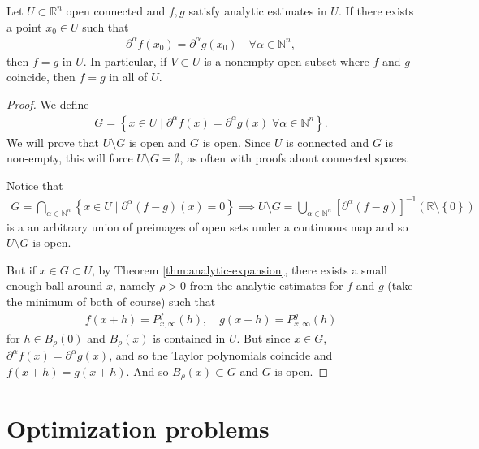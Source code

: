 \begin{corollary}
	Let $U \subset \mathbb{R}^{n}$ open connected and $f,g$ satisfy analytic estimates in $U$. If there exists a point $x_{0} \in U$ such that
	\begin{align*}
		\partial^{\alpha } f(x_{0}) = \partial^{\alpha } g(x_{0}) \quad \forall \alpha \in \mathbb{N}^{n},
	\end{align*}
	then $f = g$ in $U$. In particular, if $V \subset U$ is a nonempty open subset where $f$ and $g$ coincide, then $f = g$ in all of $U$.
\end{corollary}
\begin{proof}
	We define
	\begin{align*}
		G = \left\{ x \in U \mid \partial^{\alpha} f(x) = \partial^{\alpha }g(x) \; \forall \alpha \in \mathbb{N}^{n} \right\}.
	\end{align*}
	We will prove that $U \setminus G$ is open and $G$ is open. Since $U$ is connected and $G$ is non-empty, this will force $U \setminus G = \emptyset$, as often with proofs about connected spaces.

	Notice that
	\begin{align*}
		G = \bigcap_{\alpha \in \mathbb{N}^{n}} \left\{ x \in U \mid \partial^{\alpha }(f-g)(x) = 0 \right\} \implies U \setminus G = \bigcup_{\alpha  \in \mathbb{N}^{n}} [\partial^{\alpha }(f-g)]^{-1}(\mathbb{R} \setminus \left\{ 0 \right\})
	\end{align*}
	is a an arbitrary union of preimages of open sets under a continuous map and so $U \setminus G$ is open.

	But if $x \in G \subset U$, by Theorem \ref{thm:analytic-expansion}, there exists a small enough ball around $x$, namely $\rho > 0$ from the analytic estimates for $f$ and $g$ (take the minimum of both of course) such that
	\begin{align*}
		f(x+h) = P_{x, \infty}^{f}(h), \quad g(x+h) = P_{x, \infty}^{g}(h)
	\end{align*}
	for $h \in B_{\rho}(0)$ and $B_{\rho}(x)$ is contained in $U$. But since $x \in G$, $\partial^{\alpha }f(x) = \partial^{\alpha }g(x)$, and so the Taylor polynomials coincide and $f(x+h) = g(x+h)$. And so $B_{\rho}(x) \subset G$ and $G$ is open.
\end{proof}

\chapter{Optimization problems}

